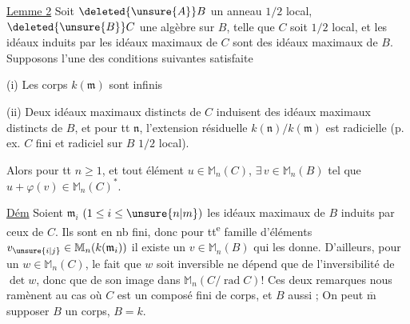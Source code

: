 \uline{Lemme 2} Soit $\deleted{\unsure{A}}B$ un anneau $1/2$ local, $\deleted{\unsure{B}}C$ une algèbre 
sur $B$, telle que $C$ soit $1/2$ local, et les idéaux
induits par les idéaux maximaux  de $C$ sont des
idéaux maximaux   de $B$. Supposons l'une
des conditions suivantes satisfaite

(i) Les corps $k(\mathfrak m)$ sont infinis

(ii) Deux idéaux maximaux  distincts de $C$
induisent des idéaux maximaux  distincts de $B$,
et pour tt $\mathfrak n$, l'extension résiduelle $k(\mathfrak n)/k(\mathfrak m)$
est radicielle (p. ex. $C$ fini et radiciel sur $B$
$1/2$ local).

Alors pour tt $n\geq1$, et tout élément $u\in\mathbb M_n(C)$,
$\exists\,v\in\mathbb M_n(B)$ tel que $u+\varphi(v)\in\mathbb M_n(C)^*$.

\uline{Dém}
Soient $\mathfrak m_i$ $(1\leq i\leq\unsure{n|m})$ les idéaux maximaux de
$B$ induits par ceux de $C$. Ils sont en nb fini,
donc pour tt\textsuperscript{e} famille d'éléments $v_{\unsure{i|j}}\in\mathbb M_n(k(\mathfrak m_i))$
il existe un $v\in\mathbb M_n(B)$ qui les donne. D'ailleurs,
pour un $w\in\mathbb M_n(C)$, le fait que $w$ soit
inversible ne dépend que de l'inversibilité de $\det w$,
donc que de son image dans $\mathbb M_n(C/\operatorname{rad} C)$! Ces
deux remarques nous ramènent au cas où $C$ est
un composé fini de corps, et $B$ aussi ; On
peut $\overline{\mathrm m}$ supposer $B$ un corps, $B=k$.
